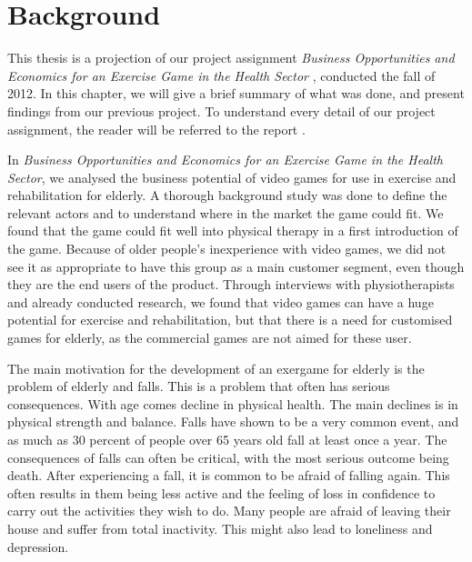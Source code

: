 \chapter{Background}
\label{chap:background}
This thesis is a projection of our project assignment \emph{Business Opportunities and Economics for an Exercise Game in the Health Sector} \cite{project}, conducted the fall of 2012. In this chapter, we will give a brief summary of what was done, and present findings from our previous project. To understand every detail of our project assignment, the reader will be referred to the report \cite{project}. 

In \emph{Business Opportunities and Economics for an Exercise Game in the Health Sector}, we analysed the business potential of video games for use in exercise and rehabilitation for elderly. A thorough background study was done to define the relevant actors and to understand where in the market the game could fit. We found that the game could fit well into physical therapy in a first introduction of the game. Because of older people's inexperience with video games, we did not see it as appropriate to have this group as a main customer segment, even though they are the end users of the product. Through interviews with physiotherapists and already conducted research, we found that video games can have a huge potential for exercise and rehabilitation, but that there is a need for customised games for elderly, as the commercial games are not aimed for these user. 

The main motivation for the development of an exergame for elderly is the problem of elderly and falls. This is a problem that often has serious consequences. With age comes decline in physical health. The main declines is in physical strength and balance. Falls have shown to be a very common event, and as much as 30 percent of people over 65 years old fall at least once a year. The consequences of falls can often be critical, with the most serious outcome being death. After experiencing a fall, it is common to be afraid of falling again. This often results in them being less active and the feeling of loss in confidence to carry out the activities they wish to do. Many people are afraid of leaving their house and suffer from total inactivity. This might also lead to loneliness and depression. 

